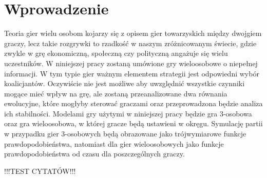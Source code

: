 \chapter{Wprowadzenie}
\label{cha:wprowadzenie}

Teoria gier wielu osobom kojarzy się z opisem gier towarzyskich między dwojgiem graczy, lecz takie rozgrywki to rzadkość w naszym zróżnicowanym świecie, gdzie zwykle w grę ekonomiczną, społeczną czy polityczną angażuje się wielu uczestników. 
W niniejszej pracy zostaną umówione gry wieloosobowe o niepełnej informacji. W tym typie gier ważnym elementem strategii jest odpowiedni wybór koalicjantów. Oczywiście nie jest możliwe aby uwzględnić wszystkie czynniki mogące mieć wpływ na grę, ale zostaną przeanalizowane dwa równania ewolucyjne, które mogłyby sterować graczami oraz przeprowadzona będzie analiza ich stabilności. Modelami gry użytymi w niniejszej pracy będzie gra 3-osobowa oraz gra wieloosobowa, w której gracze będą ustawieni w okręgu. Symulację partii w przypadku gier 3-osobowych będą obrazowane jako trójwymiarowe funkcje prawdopodobieństwa, natomiast dla gier wieloosobowych jako funkcje prawdopodobieństwa od czasu dla poszczególnych graczy.


!!!TEST CYTATÓW!!! \cite{Now06} \cite{Hof98} \cite{Str01} \cite{Qt} \cite{Tut} \cite{Sza} \cite{Fsmd} \cite{Crf}